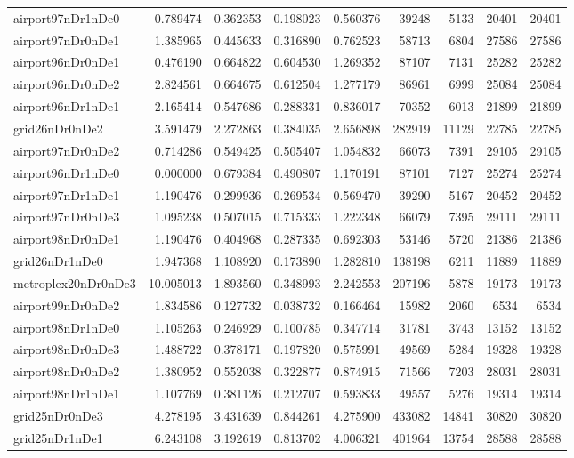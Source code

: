 \documentclass[../../../thesis.tex]{subfiles}
\begin{document}
\begin{longtable}{|l|r|r|r|r|r|r|r|r|}
airport97nDr1nDe0 & 0.789474 & 0.362353 & 0.198023 & 0.560376 & 39248 & 5133 & 20401 & 20401 \\
airport97nDr0nDe1 & 1.385965 & 0.445633 & 0.316890 & 0.762523 & 58713 & 6804 & 27586 & 27586 \\
airport96nDr0nDe1 & 0.476190 & 0.664822 & 0.604530 & 1.269352 & 87107 & 7131 & 25282 & 25282 \\
airport96nDr0nDe2 & 2.824561 & 0.664675 & 0.612504 & 1.277179 & 86961 & 6999 & 25084 & 25084 \\
airport96nDr1nDe1 & 2.165414 & 0.547686 & 0.288331 & 0.836017 & 70352 & 6013 & 21899 & 21899 \\
grid26nDr0nDe2 & 3.591479 & 2.272863 & 0.384035 & 2.656898 & 282919 & 11129 & 22785 & 22785 \\
airport97nDr0nDe2 & 0.714286 & 0.549425 & 0.505407 & 1.054832 & 66073 & 7391 & 29105 & 29105 \\
airport96nDr1nDe0 & 0.000000 & 0.679384 & 0.490807 & 1.170191 & 87101 & 7127 & 25274 & 25274 \\
airport97nDr1nDe1 & 1.190476 & 0.299936 & 0.269534 & 0.569470 & 39290 & 5167 & 20452 & 20452 \\
airport97nDr0nDe3 & 1.095238 & 0.507015 & 0.715333 & 1.222348 & 66079 & 7395 & 29111 & 29111 \\
airport98nDr0nDe1 & 1.190476 & 0.404968 & 0.287335 & 0.692303 & 53146 & 5720 & 21386 & 21386 \\
grid26nDr1nDe0 & 1.947368 & 1.108920 & 0.173890 & 1.282810 & 138198 & 6211 & 11889 & 11889 \\
metroplex20nDr0nDe3 & 10.005013 & 1.893560 & 0.348993 & 2.242553 & 207196 & 5878 & 19173 & 19173 \\
airport99nDr0nDe2 & 1.834586 & 0.127732 & 0.038732 & 0.166464 & 15982 & 2060 & 6534 & 6534 \\
airport98nDr1nDe0 & 1.105263 & 0.246929 & 0.100785 & 0.347714 & 31781 & 3743 & 13152 & 13152 \\
airport98nDr0nDe3 & 1.488722 & 0.378171 & 0.197820 & 0.575991 & 49569 & 5284 & 19328 & 19328 \\
airport98nDr0nDe2 & 1.380952 & 0.552038 & 0.322877 & 0.874915 & 71566 & 7203 & 28031 & 28031 \\
airport98nDr1nDe1 & 1.107769 & 0.381126 & 0.212707 & 0.593833 & 49557 & 5276 & 19314 & 19314 \\
grid25nDr0nDe3 & 4.278195 & 3.431639 & 0.844261 & 4.275900 & 433082 & 14841 & 30820 & 30820 \\
grid25nDr1nDe1 & 6.243108 & 3.192619 & 0.813702 & 4.006321 & 401964 & 13754 & 28588 & 28588 \\

\end{longtable}
\end{document}
